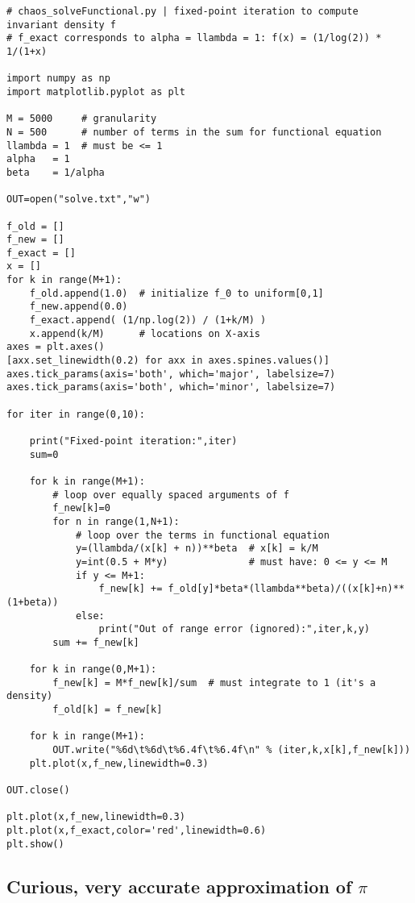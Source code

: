 \documentclass[oneside,10pt]{book}
\begin{document}
\begin{lstlisting}
# chaos_solveFunctional.py | fixed-point iteration to compute invariant density f
# f_exact corresponds to alpha = llambda = 1: f(x) = (1/log(2)) * 1/(1+x)

import numpy as np
import matplotlib.pyplot as plt

M = 5000     # granularity
N = 500      # number of terms in the sum for functional equation
llambda = 1  # must be <= 1
alpha   = 1
beta    = 1/alpha

OUT=open("solve.txt","w")

f_old = []
f_new = []
f_exact = []
x = []
for k in range(M+1):
    f_old.append(1.0)  # initialize f_0 to uniform[0,1]
    f_new.append(0.0)
    f_exact.append( (1/np.log(2)) / (1+k/M) )
    x.append(k/M)      # locations on X-axis
axes = plt.axes()
[axx.set_linewidth(0.2) for axx in axes.spines.values()]
axes.tick_params(axis='both', which='major', labelsize=7)
axes.tick_params(axis='both', which='minor', labelsize=7)

for iter in range(0,10):

    print("Fixed-point iteration:",iter)
    sum=0

    for k in range(M+1):
        # loop over equally spaced arguments of f
        f_new[k]=0
        for n in range(1,N+1):
            # loop over the terms in functional equation
            y=(llambda/(x[k] + n))**beta  # x[k] = k/M
            y=int(0.5 + M*y)              # must have: 0 <= y <= M
            if y <= M+1:
                f_new[k] += f_old[y]*beta*(llambda**beta)/((x[k]+n)**(1+beta))
            else:
                print("Out of range error (ignored):",iter,k,y)
        sum += f_new[k]

    for k in range(0,M+1):
        f_new[k] = M*f_new[k]/sum  # must integrate to 1 (it's a density)
        f_old[k] = f_new[k]

    for k in range(M+1):
        OUT.write("%6d\t%6d\t%6.4f\t%6.4f\n" % (iter,k,x[k],f_new[k]))
    plt.plot(x,f_new,linewidth=0.3)

OUT.close()

plt.plot(x,f_new,linewidth=0.3)
plt.plot(x,f_exact,color='red',linewidth=0.6)
plt.show()
\end{lstlisting}

\subsection{Curious, very accurate approximation of $\pi$}
\end{document}
